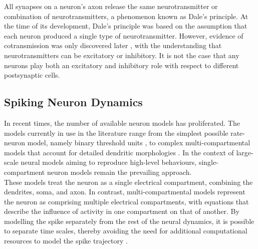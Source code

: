 

\noindent All synapses on a neuron's axon release the same neurotransmitter or combination of neurotransmitters, a phenomenon known as Dale's principle. At the time of its development, Dale's principle was based on the assumption that each neuron produced a single type of neurotransmitter. However, evidence of cotransmission was only discovered later \cite{burnstock2004cotransmission}, with the understanding that neurotransmitters can be excitatory or inhibitory. It is not the case that any neurons play both an excitatory and inhibitory role with respect to different postsynaptic cells.

\subsection[Spiking Neuron Dynamics]{Spiking Neuron Dynamics}

\noindent In recent times, the number of available neuron models has proliferated. The models currently in use in the literature range from the simplest possible rate-neuron model, namely binary threshold units \cite{stocks2001information}, to complex multi-compartmental models that account for detailed dendritic morphologies \cite{markram2015reconstruction}. In the context of large-scale neural models aiming to reproduce high-level behaviours, single-compartment neuron models remain the prevailing approach. \\

\noindent These models treat the neuron as a single electrical compartment, combining the dendrites, soma, and axon. In contrast, multi-compartmental models represent the neuron as comprising multiple electrical compartments, with equations that describe the influence of activity in one compartment on that of another. By modelling the spike separately from the rest of the neural dynamics, it is possible to separate time scales, thereby avoiding the need for additional computational resources to model the spike trajectory \cite{abbott1999lapicque}. \\

